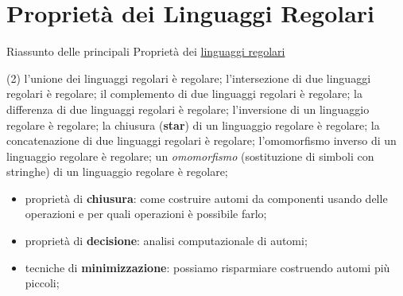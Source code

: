 \section{Proprietà dei Linguaggi Regolari}\label{sec:lr_propriet_dei_linguaggi_regolari} %
\begin{remark}{Riassunto delle principali Proprietà dei \hyperref[def:ling-reg]{linguaggi regolari}}{}
    \begin{tasks}(2)    
        \task l'unione dei linguaggi regolari è regolare;
        \task l'intersezione di due linguaggi regolari è regolare;
        \task il complemento di due linguaggi regolari è regolare;
        \task la differenza di due linguaggi regolari è regolare;
        \task l'inversione di un linguaggio regolare è regolare;
        \task la chiusura (\textbf{star}) di un linguaggio regolare è regolare;
        \task la concatenazione di due linguaggi regolari è regolare;
        \task l'omomorfismo inverso di un linguaggio regolare è regolare;
        \task un \textit{omomorfismo} (sostituzione di simboli con stringhe) di un linguaggio regolare è regolare;
    \end{tasks}
\end{remark}
\begin{note}
    \begin{itemize}
        \item proprietà di \textbf{chiusura}: come costruire automi da componenti usando delle operazioni e per quali operazioni è possibile farlo;
        \item proprietà di \textbf{decisione}: analisi computazionale di automi;
        \item tecniche di \textbf{minimizzazione}: possiamo risparmiare costruendo automi più piccoli;
    \end{itemize}
\end{note}
%
